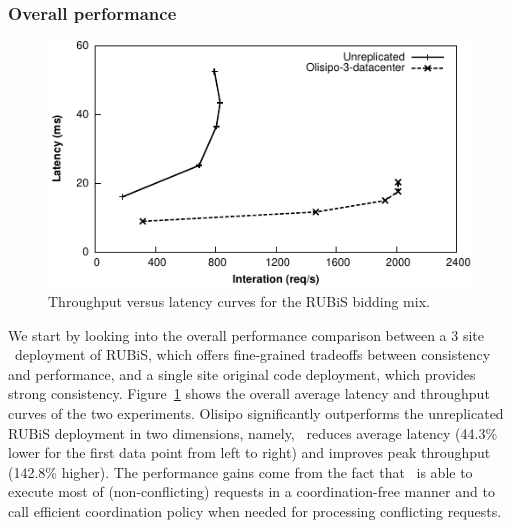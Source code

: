 \subsubsection{Overall performance}
\begin{figure}[t!]
  \centering
\includegraphics[width=0.85\columnwidth]{figures/eval/throughput_unreplicated_vs_por.pdf}
  \caption{Throughput versus latency curves for the RUBiS bidding mix.}
 \label{fig:por:thptunreplicatevspor}
\end{figure}

We start by looking into the overall performance comparison between a 3 site \coordtool\ deployment of
RUBiS, which offers fine-grained tradeoffs between consistency and performance, and a single site original code deployment,
which provides strong consistency. Figure~\ref{fig:por:thptunreplicatevspor} shows the overall average latency and throughput curves of the
two experiments. Olisipo significantly outperforms the unreplicated RUBiS deployment in two dimensions,
namely, \coordtool\ reduces average latency (44.3\% lower for the first data point from left to right) and improves peak throughput (142.8\% higher).
The performance gains come from the fact that \coordtool\ is able to execute most of (non-conflicting) requests 
in a coordination-free manner and to call efficient coordination policy when needed for processing conflicting requests.

